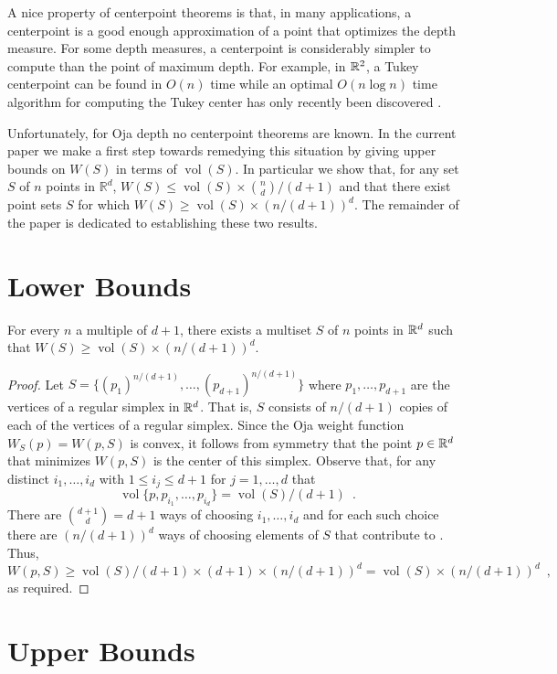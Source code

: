 \documentclass[lotsofwhite]{patmorin}
\DeclareMathOperator{\vol}{vol}
\begin{document}
A nice property of centerpoint theorems is that, in many applications,
a centerpoint is a good enough approximation of a point that optimizes
the depth measure.  For some depth measures, a centerpoint is
considerably simpler to compute than the point of maximum depth. For
example, in $\mathbb{R}^2$, a Tukey centerpoint can be found in $O(n)$ time
\cite{mxXX} while an optimal $O(n\log n)$ time algorithm for computing
the Tukey center has only recently been discovered \cite{c04}.

Unfortunately, for Oja depth no centerpoint theorems are known.  In
the current paper we make a first step towards remedying this
situation by giving upper bounds on $W(S)$ in terms of 
$\vol(S)$.  In particular we show that, for any set $S$
of $n$ points in $\mathbb{R}^d$, $W(S)\le \vol(S)\times {n\choose
d}/(d+1)$ and that there exist point sets $S$ for which $W(S)\ge
\vol(S)\times(n/(d+1))^d$.  The remainder of the paper is dedicated
to establishing these two results.

\section{Lower Bounds}

\begin{thm}
For every $n$ a multiple of $d+1$,
there exists a multiset $S$ of $n$ points in $\mathbb{R}^d$ such that
$W(S)\ge\vol(S)\times (n/(d+1))^d$.
\end{thm}

\begin{proof}
Let $S=\{(p_1)^{n/(d+1)},\ldots,(p_{d+1})^{n/(d+1)}\}$ where 
$p_1,\ldots,p_{d+1}$ are the vertices of a regular simplex
in $\mathbb{R}^d$.  That is, $S$ consists of $n/(d+1)$ copies of each of the
vertices of a regular simplex.
Since the Oja weight function $W_S(p)=W(p,S)$
is convex, it follows from symmetry that the point $p\in\mathbb{R}^d$ that
minimizes $W(p,S)$ is the center of this simplex.  Observe that, for
any distinct $i_1,\ldots,i_d$ with $1\le i_j\le d+1$ for
$j=1,\ldots,d$ that
\[
   \vol\{p,p_{i_1},\ldots,p_{i_d}\} = \vol(S)/(d+1) \enspace .
\]
There are ${d+1 \choose d}=d+1$ ways of choosing $i_1,\ldots,i_d$ and
for each such choice there are $(n/(d+1))^d$ ways of choosing elements
of $S$ that contribute to . Thus,
\[
    W(p,S) \ge \vol(S)/(d+1)\times (d+1)\times (n/(d+1))^d
     = \vol(S)\times (n/(d+1))^d \enspace ,
\]
as required. 
\end{proof}

\section{Upper Bounds}
\end{document}

